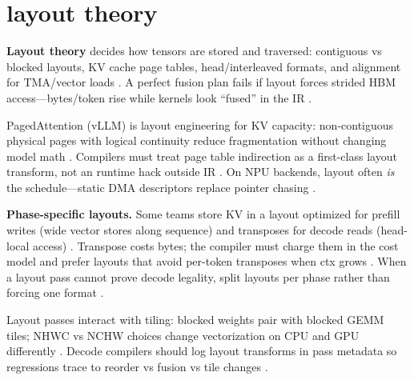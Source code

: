 \section{layout theory}
\label{sec:ch13_layout_theory}

\textbf{Layout theory} decides how tensors are stored and traversed: contiguous vs blocked layouts, KV cache page tables, head/interleaved formats, and alignment for TMA/vector loads \citep{kwon2023vllm,patel2025llminference,semianalysis2024tma,nvidia2022hopper}. A perfect fusion plan fails if layout forces strided HBM access---bytes/token rise while kernels look ``fused'' in the IR \citep{memoryfloor2026,yirage2026,taxbreak2026,chen2020compilerbasedhardw}.

PagedAttention (vLLM) is layout engineering for KV capacity: non-contiguous physical pages with logical continuity reduce fragmentation without changing model math \citep{kwon2023vllm,patel2025llminference,taxbreak2026}. Compilers must treat page table indirection as a first-class layout transform, not an runtime hack outside IR \citep{yirage2026,chen2020compilerbasedhardw,liu2024deepseekv3}. On NPU backends, layout often \emph{is} the schedule---static DMA descriptors replace pointer chasing \citep{amd2024xdna,amd2024aie,dlbook}.

\textbf{Phase-specific layouts.} Some teams store KV in a layout optimized for prefill writes (wide vector stores along sequence) and transposes for decode reads (head-local access) \citep{kwon2023vllm,dao2023flashdecoding,patel2025llminference}. Transpose costs bytes; the compiler must charge them in the cost model and prefer layouts that avoid per-token transposes when ctx grows \citep{memoryfloor2026,taxbreak2026,yirage2026,chen2020compilerbasedhardw,semianalysis2024tma,dlbook,amd2024xdna,amd2024aie,liu2024deepseekv3,dao2022flashattention,nvidia2022hopper,nvidia2024cudagraphs,dao2023flashdecoding}. When a layout pass cannot prove decode legality, split layouts per phase rather than forcing one format \citep{patel2025llminference,yirage2026,chen2020compilerbasedhardw,memoryfloor2026,taxbreak2026,dlbook}.

Layout passes interact with tiling: blocked weights pair with blocked GEMM tiles; NHWC vs NCHW choices change vectorization on CPU and GPU differently \citep{dlbook,chen2020compilerbasedhardw,semianalysis2024tma,patel2025llminference,memoryfloor2026,taxbreak2026,yirage2026,amd2024xdna,kwon2023vllm,liu2024deepseekv3,dao2022flashattention,dao2023flashdecoding,nvidia2022hopper,nvidia2024cudagraphs,amd2024aie}. Decode compilers should log layout transforms in pass metadata so regressions trace to reorder vs fusion vs tile changes \citep{yirage2026,chen2020compilerbasedhardw,patel2025llminference,taxbreak2026,memoryfloor2026,semianalysis2024tma,amd2024xdna,amd2024aie,dlbook,kwon2023vllm,liu2024deepseekv3,dao2022flashattention,dao2023flashdecoding,nvidia2022hopper,nvidia2024cudagraphs}.

